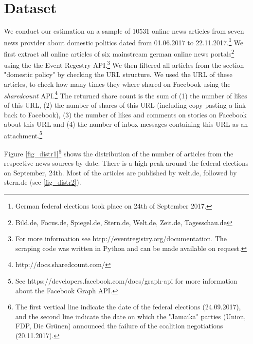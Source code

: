 \documentclass[12pt,a4paper,notitlepage]{article}
\begin{document}
\section{Dataset}\label{ch_data}

We conduct our estimation on a sample of 10531 online news articles from seven news provider about domestic politics dated from 01.06.2017 to 22.11.2017.\footnote{German federal elections took place on 24th of September 2017.} We first extract all online articles of six mainstream german online news portals\footnote{Bild.de, Focus.de, Spiegel.de, Stern.de, Welt.de, Zeit.de, Tagesschau.de} using the the Event Regestry API.\footnote{For more information see http://eventregistry.org/documentation. The scraping code was written in Python and can be made available on request.} We then filtered all articles from the section "domestic policy" by checking the URL structure. We used the URL of these articles, to check how many times they where shared on Facebook using the \textit{sharedcount} API.\footnote{http://docs.sharedcount.com/} The returned share count is the sum of (1) the number of likes of this URL, (2) the number of shares of this URL (including copy-pasting a link back to Facebook), (3) the number of likes and comments on stories on Facebook about this URL and (4) the number of inbox messages containing this URL as an attachment.\footnote{See https://developers.facebook.com/docs/graph-api for more information about the Facebook Graph API.}

Figure \ref{fig_distr1}\footnote{The first vertical line indicate the date of the federal elections (24.09.2017), and the second line indicate the date on which the "Jamaika" parties (Union, FDP, Die Grünen) announced the failure of the coalition negotiations (20.11.2017).} shows the distribution of the number of articles from the respective news sources by date. There is a high peak around the federal elections on September, 24th. Most of the articles are published by welt.de, followed by stern.de (see \ref{fig_distr2}).  
\end{document}
